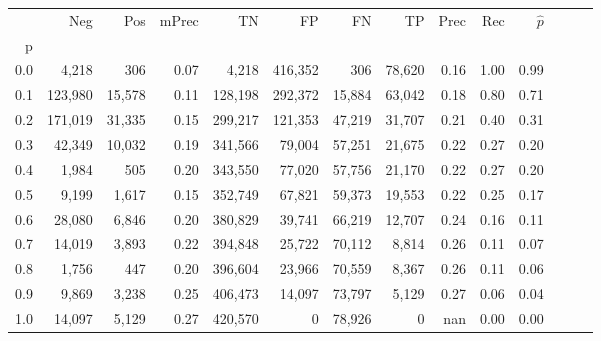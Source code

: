 \begin{tabular}{rrrrrrrrrrrrrr}
\toprule
{} &      Neg &     Pos & mPrec &       TN &       FP &      FN &      TP &  Prec &   Rec & $\hat{p}$ \\
p   &          &         &       &          &          &         &         &       &       &           \\
\midrule
0.0 &    4,218 &     306 &  0.07 &    4,218 &  416,352 &     306 &  78,620 &  0.16 &  1.00 &      0.99 \\
0.1 &  123,980 &  15,578 &  0.11 &  128,198 &  292,372 &  15,884 &  63,042 &  0.18 &  0.80 &      0.71 \\
0.2 &  171,019 &  31,335 &  0.15 &  299,217 &  121,353 &  47,219 &  31,707 &  0.21 &  0.40 &      0.31 \\
0.3 &   42,349 &  10,032 &  0.19 &  341,566 &   79,004 &  57,251 &  21,675 &  0.22 &  0.27 &      0.20 \\
0.4 &    1,984 &     505 &  0.20 &  343,550 &   77,020 &  57,756 &  21,170 &  0.22 &  0.27 &      0.20 \\
0.5 &    9,199 &   1,617 &  0.15 &  352,749 &   67,821 &  59,373 &  19,553 &  0.22 &  0.25 &      0.17 \\
0.6 &   28,080 &   6,846 &  0.20 &  380,829 &   39,741 &  66,219 &  12,707 &  0.24 &  0.16 &      0.11 \\
0.7 &   14,019 &   3,893 &  0.22 &  394,848 &   25,722 &  70,112 &   8,814 &  0.26 &  0.11 &      0.07 \\
0.8 &    1,756 &     447 &  0.20 &  396,604 &   23,966 &  70,559 &   8,367 &  0.26 &  0.11 &      0.06 \\
0.9 &    9,869 &   3,238 &  0.25 &  406,473 &   14,097 &  73,797 &   5,129 &  0.27 &  0.06 &      0.04 \\
1.0 &   14,097 &   5,129 &  0.27 &  420,570 &        0 &  78,926 &       0 &   nan &  0.00 &      0.00 \\
\bottomrule
\end{tabular}

